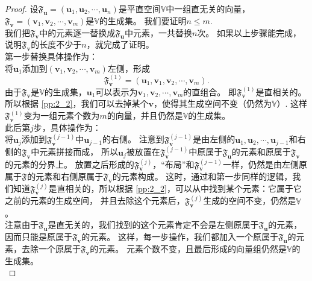 \documentclass[12pt,UTF8]{ctexbook}
\begin{document}
\begin{appendix}
\begin{proof}
    设$\mathfrak{F}_{\mathbf{u}} = (\mathbf{u}_1, \mathbf{u}_2, \cdots , \mathbf{u}_n )$是平直空间$\mathbb{V}$中一组直无关的向量，
    $\mathfrak{F}_{\mathbf{v}} = (\mathbf{v}_1, \mathbf{v}_2, \cdots , \mathbf{v}_m )$是$\mathbb{V}$的生成集。
    我们要证明$n \leq m$. \\    
    我们把$\mathfrak{F}_{\mathbf{v}}$中的元素逐一替换成$\mathfrak{F}_{\mathbf{u}}$中元素，一共替换$n$次。
    如果以上步骤能完成，说明$\mathfrak{F}_{\mathbf{v}}$的长度不少于$n$，就完成了证明。\\    
    第一步替换具体操作为：\\    
    将$\mathbf{u}_1$添加到$(\mathbf{v}_1, \mathbf{v}_2, \cdots , \mathbf{v}_m )$左侧，形成
    $$\mathfrak{F}_{\mathbf{v}}^{(1)} = (\mathbf{u}_1, \mathbf{v}_1, \mathbf{v}_2, \cdots , \mathbf{v}_m ).$$
    由于$\mathfrak{F}_{\mathbf{v}}$是$\mathbb{V}$的生成集，$\mathbf{u}_1$可以表示为$\mathbf{v}_1, \mathbf{v}_2, \cdots , \mathbf{v}_m$的直组合。
    即$\mathfrak{F}_{\mathbf{v}}^{(1)}$是直相关的。所以根据 \ref{pp:2_2}，我们可以去掉某个$\mathbf{v}$，使得其生成空间不变（仍然为$\mathbb{V}$）.
    这样$\mathfrak{F}_{\mathbf{v}}^{(1)}$变为一组元素个数为$m$的向量，并且仍然是$\mathbb{V}$的生成集。\\
    此后第$j$步，具体操作为：\\
    将$\mathbf{u}_j$添加到$\mathfrak{F}_{\mathbf{v}}^{(j-1)}$中$\mathbf{u}_{j-1}$的右侧。
    注意到$\mathfrak{F}_{\mathbf{v}}^{(j-1)}$是由左侧的$\mathbf{u}_1, \mathbf{u}_2, \cdots , \mathbf{u}_{j-1}$和右侧的$\mathfrak{F}_{\mathbf{v}}$中元素拼接而成，
    所以$\mathbf{u}_j$被放置在$\mathfrak{F}_{\mathbf{v}}^{(j-1)}$中原属于$\mathfrak{F}_{\mathbf{u}}$的元素和原属于$\mathfrak{F}_{\mathbf{v}}$的元素的分界上。
    放置之后形成的$\mathfrak{F}_{\mathbf{v}}^{(j)}$，“布局”和$\mathfrak{F}_{\mathbf{v}}^{(j-1)}$一样，仍然是由左侧原属于$\mathfrak{F}_{\mathbf{}}$的元素和右侧原属于$\mathfrak{F}_{\mathbf{v}}$的元素构成。
    这时，通过和第一步同样的逻辑，我们知道$\mathfrak{F}_{\mathbf{v}}^{(j)}$是直相关的，所以根据 \ref{pp:2_2}，可以从中找到某个元素：它属于它之前的元素的生成空间，
    并且去除这个元素后，$\mathfrak{F}_{\mathbf{v}}^{(j)}$生成的空间不变，仍然是$\mathbb{V}$。\\
    注意由于$\mathfrak{F}_{\mathbf{u}}$是直无关的，我们找到的这个元素肯定不会是左侧原属于$\mathfrak{F}_{\mathbf{u}}$的元素，因而只能是原属于$\mathfrak{F}_{\mathbf{v}}$的元素。
    这样，每一步操作，我们都加入一个原属于$\mathfrak{F}_{\mathbf{u}}$的元素，去除一个原属于$\mathfrak{F}_{\mathbf{v}}$的元素。
    元素个数不变，且最后形成的向量组仍然是$\mathbb{V}$的生成集。\\

\end{proof}
\end{appendix}
\end{document}
